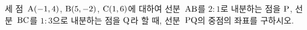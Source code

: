 세 점~$\mathrm{A}(-1{,}\mkern3mu\mathopen{}4)$, $\mathrm{B}(5{,}\mkern3mu\mathopen{}-2)$, $\mathrm{C}(1{,}\mkern3mu\mathopen{}6)$에 대하여 선분~$\mathrm{AB}$를 $2:1$로 내분하는 점을 $\mathrm{P}$, 선분~$\mathrm{BC}$를 $1:3$으로 내분하는 점을 $\mathrm{Q}$라 할 때, 선분~$\mathrm{PQ}$의 중점의 좌표를 구하시오.
